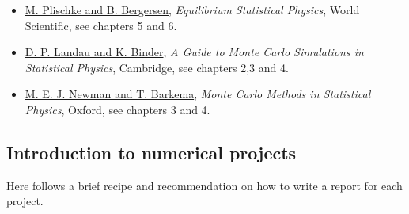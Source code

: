 \documentclass[%
oneside,                 %
final,                   %
10pt]{article}
\begin{document}
\begin{itemize}
  \item \href{{http://www.worldscientific.com/worldscibooks/10.1142/5660}}{M. Plischke and B. Bergersen}, \emph{Equilibrium Statistical Physics}, World Scientific, see chapters 5 and 6.

  \item \href{{http://www.cambridge.org/no/academic/subjects/physics/computational-science-and-modelling/guide-monte-carlo-simulations-statistical-physics-4th-edition?format=HB}}{D. P. Landau and K. Binder}, \emph{A Guide to Monte Carlo Simulations in Statistical Physics}, Cambridge, see chapters 2,3 and 4.

  \item \href{{https://global.oup.com/academic/product/monte-carlo-methods-in-statistical-physics-9780198517979?cc=no&lang=en&}}{M. E. J. Newman and T. Barkema}, \emph{Monte Carlo Methods in Statistical Physics}, Oxford, see chapters 3 and 4.
\end{itemize}

\noindent
\subsection*{Introduction to numerical projects}

Here follows a brief recipe and recommendation on how to write a report for each
project.
\end{document}
